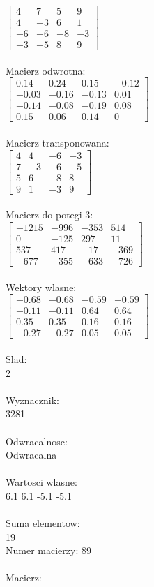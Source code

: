 \documentclass[a4paper,12pt]{article}
\begin{document}
$\begin{bmatrix} 4&7&5&9\\4&-3&6&1\\-6&-6&-8&-3\\-3&-5&8&9 \end{bmatrix}$
\\
\\
Macierz odwrotna:\\

$\begin{bmatrix} 0.14&0.24&0.15&-0.12\\-0.03&-0.16&-0.13&0.01\\-0.14&-0.08&-0.19&0.08\\0.15&0.06&0.14&0 \end{bmatrix}$
\\
\\
Macierz transponowana:\\

$\begin{bmatrix} 4&4&-6&-3\\7&-3&-6&-5\\5&6&-8&8\\9&1&-3&9 \end{bmatrix}$
\\
\\
Macierz do potegi 3:\\

$\begin{bmatrix} -1215&-996&-353&514\\0&-125&297&11\\537&417&-17&-369\\-677&-355&-633&-726 \end{bmatrix}$
\\
\\
Wektory wlasne:\\

$\begin{bmatrix} -0.68&-0.68&-0.59&-0.59\\-0.11&-0.11&0.64&0.64\\0.35&0.35&0.16&0.16\\-0.27&-0.27&0.05&0.05 \end{bmatrix}$
\\
\\
Slad:\\
2
\\
\\
Wyznacznik:\\
3281
\\
\\
Odwracalnosc:\\
Odwracalna
\\
\\
Wartosci wlasne:\\
6.1 6.1 -5.1 -5.1
\\
\\
Suma elementow:\\
19
\\
\newpage
Numer macierzy:
89
\\
\\
Macierz:\\
\end{document}
